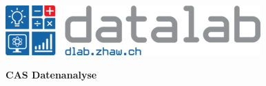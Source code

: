 \noindent
\begin{minipage}[t]{0.4\textwidth} 
\includegraphics[width=\linewidth]{logo_cas.png}
\end{minipage}%
\hfill%
\begin{minipage}[t]{0.6\textwidth}\raggedleft
\textbf{\large CAS Datenanalyse}
\end{minipage}


